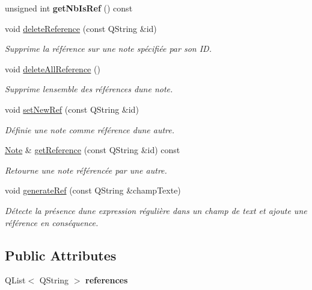 \begin{DoxyCompactItemize}
unsigned int {\bfseries get\+Nb\+Is\+Ref} () const
\item 
void \hyperlink{class_note_a91c86cf6ed18e4badb59a41e737a15fa}{delete\+Reference} (const Q\+String \&id)
\begin{DoxyCompactList}\small\item\em Supprime la référence sur une note spécifiée par son ID. \end{DoxyCompactList}\item 
void \hyperlink{class_note_aacbb89b120107a4b25dd16043908c693}{delete\+All\+Reference} ()
\begin{DoxyCompactList}\small\item\em Supprime l\textquotesingle{}ensemble des références d\textquotesingle{}une note. \end{DoxyCompactList}\item 
void \hyperlink{class_note_a3af2edc369310b9f122bd1fd6dbfa717}{set\+New\+Ref} (const Q\+String \&id)
\begin{DoxyCompactList}\small\item\em Définie une note comme référence d\textquotesingle{}une autre. \end{DoxyCompactList}\item 
\hyperlink{class_note}{Note} \& \hyperlink{class_note_a8e3ba6961f62a38f49b5fd209c083896}{get\+Reference} (const Q\+String \&id) const
\begin{DoxyCompactList}\small\item\em Retourne une note référencée par une autre. \end{DoxyCompactList}\item 
void \hyperlink{class_note_a5a0cb370ddd5a3da10fe8aa8a256d661}{generate\+Ref} (const Q\+String \&champ\+Texte)
\begin{DoxyCompactList}\small\item\em Détecte la présence d\textquotesingle{}une expression régulière dans un champ de text et ajoute une référence en conséquence. \end{DoxyCompactList}\end{DoxyCompactItemize}
\subsection*{Public Attributes}
\begin{DoxyCompactItemize}
\item 
\mbox{\label{class_note_ad8918cd74c86c9e00d72cb1a6a5a0f88}} 
Q\+List$<$ Q\+String $>$ {\bfseries references}
\end{DoxyCompactItemize}



